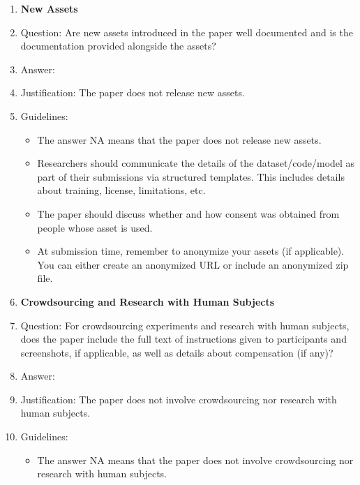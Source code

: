 \documentclass{article}
\begin{document}
\begin{enumerate}
\begin{itemize}
        \item For existing datasets that are re-packaged, both the original license and the license of the derived asset (if it has changed) should be provided.
        \item If this information is not available online, the authors are encouraged to reach out to the asset's creators.
    \end{itemize}
\item {\bf New Assets}
    \item[] Question: Are new assets introduced in the paper well documented and is the documentation provided alongside the assets?
    \item[] Answer: \answerNA{}
    \item[] Justification: The paper does not release new assets.
    \item[] Guidelines:
    \begin{itemize}
        \item The answer NA means that the paper does not release new assets.
        \item Researchers should communicate the details of the dataset/code/model as part of their submissions via structured templates. This includes details about training, license, limitations, etc.
        \item The paper should discuss whether and how consent was obtained from people whose asset is used.
        \item At submission time, remember to anonymize your assets (if applicable). You can either create an anonymized URL or include an anonymized zip file.
    \end{itemize}
\item {\bf Crowdsourcing and Research with Human Subjects}
    \item[] Question: For crowdsourcing experiments and research with human subjects, does the paper include the full text of instructions given to participants and screenshots, if applicable, as well as details about compensation (if any)?
    \item[] Answer: \answerNA{}
    \item[] Justification: The paper does not involve crowdsourcing nor research with human subjects.
    \item[] Guidelines:
    \begin{itemize}
        \item The answer NA means that the paper does not involve crowdsourcing nor research with human subjects.

\end{itemize}
\end{enumerate}
\end{document}
